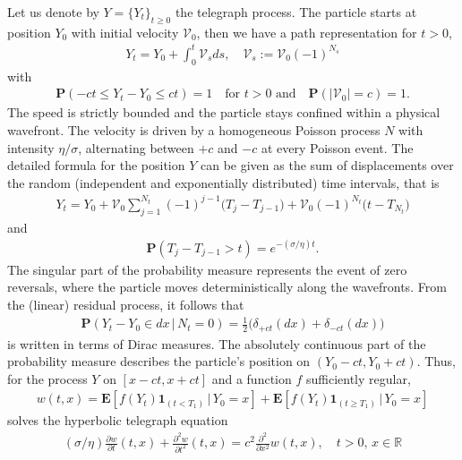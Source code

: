 \documentclass[10pt,a4paper]{article}
\numberwithin{equation}{section}
\theoremstyle{plain}
\theoremstyle{remark}
\begin{document}
Let us denote by $Y = \{Y_t\}_{t\geq 0}$ the telegraph process. The particle starts at position $Y_0$ with initial velocity $\mathcal{V}_0$, then we have a path representation for $t>0$,
\begin{align*}
Y_t = Y_0 + \int_0^t \mathcal{V}_s ds, \quad \mathcal{V}_s := \mathcal{V}_0 (-1)^{N_s}
\end{align*}
with
\begin{align*}
\mathbf{P}(-ct \leq Y_t -Y_0 \leq ct) = 1 \quad \textrm{for $t>0$ and} \quad \mathbf{P}(|\mathcal{V}_0|=c)=1.
\end{align*}
The speed is strictly bounded and the particle stays confined within a physical wavefront. The velocity is driven by a homogeneous Poisson process $N$ with intensity $\eta/\sigma$, alternating between $+c$ and $-c$ at every Poisson event. The detailed formula for the position $Y$ can be given as the sum of displacements over the random (independent and exponentially distributed) time intervals, that is
\begin{align}
Y_t = Y_0 + \mathcal{V}_0 \sum_{j=1}^{N_t} (-1)^{j-1} \big(T_j - T_{j-1} \big) + \mathcal{V}_0 (-1)^{N_t} \big( t - T_{N_t}\big)
\label{seriesTEL}
\end{align}
and
\begin{align*}
\mathbf{P}(T_j - T_{j-1} > t) = e^{-(\sigma/\eta) t}.
\end{align*}
The singular part of the probability measure represents the event of zero reversals, where the particle moves deterministically along the wavefronts. From the (linear) residual process, it follows that
\begin{align*}
\mathbf{P}(Y_t - Y_0 \in dx\, | \, N_t=0) = \frac{1}{2}\Big(\delta_{+ct}(dx) + \delta_{-ct}(dx) \Big)
\end{align*}
is written in terms of Dirac measures. The absolutely continuous part of the probability measure describes the particle's position on $(Y_0-ct, Y_0+ct)$. Thus, for the process $Y$ on $[x-ct, x+ct]$ and a function $f$ sufficiently regular,  
\begin{align*}
w(t,x) = \mathbf{E}[f(Y_t)\mathbf{1}_{(t< T_1)}\,|\, Y_0=x] + \mathbf{E}[f(Y_t)\mathbf{1}_{( t \geq T_1)}\,|\,Y_0=x] 
\end{align*}
solves the hyperbolic telegraph equation
\begin{align*}
(\sigma/\eta) \frac{\partial w}{\partial t}(t,x)  + \frac{\partial^2 w}{\partial t^2}(t,x) = c^2 \frac{\partial^2}{\partial x^2} w(t,x), \quad t>0,\, x \in \mathbb{R}
\end{align*}
\end{document}
